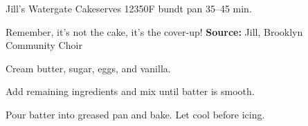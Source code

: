 \begin{recipe}{Jill's Watergate Cake}{serves 12}{350\0F \hfill bundt pan \hfill 35--45 min.}

 \freeform Remember, it's not the cake, it's the cover-up!
 \textbf{Source:} Jill, Brooklyn Community Choir

 Cream butter, sugar, eggs, and vanilla.

 Add remaining ingredients and mix until batter is smooth.

 \newstep Pour batter into greased pan and bake. Let cool before icing.
\end{recipe}
